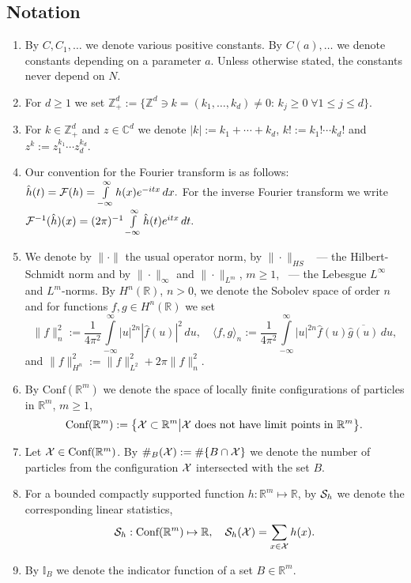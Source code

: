 \documentclass{article}
\numberwithin{equation}{section}
\newcommand{\mC}{\mathbb{C}}
\newcommand{\mR}{\mathbb{R}}
\newcommand{\mZ}{\mathbb{Z}}
\newcommand{\mI}{\mathbb{I}}
\newcommand{\FF}{{\cal F}}
\newcommand{\SSS}{{\cal S}}
\newcommand{\XX}{{\cal X}}
\newcommand{\ov}{\overline}
\newcommand{\ran}{\rangle}
\newcommand{\lan}{\langle}
\newcommand{\fr}{\frac}
\newcommand{\qu}{\quad}
\newcommand{\sli}{\sum\limits}
\newcommand{\ili}{\int\limits}
\newcommand{\lbl}{\label}
\newcommand{\bee}{\begin{equation}}
\newcommand{\eee}{\end{equation}}
\newcommand{\Zp}{\mathbb{Z}^d_+}
\newcommand{\Conf}{\mbox{Conf}}
\newcommand{\CoRr}{\Conf(\mR^m)}
\begin{document}
\subsection{Notation}
\lbl{sec:Notation}
\begin{enumerate}
\item By $C,C_1,\ldots$ we denote various positive constants. By $C(a), \ldots$ we denote constants depending on a parameter $a$.
Unless otherwise stated, the constants never depend on $N$.

\item For $d\geq 1$ we set $\Zp:=\{\mZ^d\ni k=(k_1,\ldots,k_d)\neq 0:\, k_j\geq 0\; \forall 1\leq j\leq d\}$.

\item\lbl{not:!} For $k\in\mZ^d_+$ and $z\in\mC^d$ we denote
$|k|:=k_1+\cdots+k_d$, $k!:=k_1!\cdots k_d!$ and $z^k:=z_1^{k_1}\cdots z_d^{k_d}$.

\item \lbl{not:F} Our convention for the Fourier transform is as follows:
$
\hat h(t)=\FF(h)=\ili_{-\infty}^\infty h(x)e^{-itx}\, dx.
$
For the inverse Fourier transform we write
$
\FF^{-1}(\hat h)(x)=(2\pi)^{-1}\ili_{-\infty}^\infty \hat h(t)e^{itx}\, dt.
$
\item We denote by $\|\cdot\|$ the usual operator norm, by $\|\cdot\|_{HS}$
~--- the Hilbert-Schmidt norm
and by $\|\cdot\|_\infty$ and $\|\cdot\|_{L^m}$, $m\geq 1$,
~--- the Lebesgue $L^\infty$ and  $L^m$-norms.
By $H^n(\mR)$, $n>0$, we denote the Sobolev space of order  $n$
and for functions $f,g\in H^n(\mR)$ we set
\bee\lbl{pairing}
\|f\|^2_{n} := \fr{1}{4\pi^2}\ili_{-\infty}^\infty |u|^{2n} |\hat f(u)|^2 \,du,
\qu
\lan f,g\ran_{n} := \fr{1}{4\pi^2} \ili_{-\infty}^\infty |u|^{2n}
\hat f(u) \ov{\hat g(u)}\,du,
\eee
and $\|f\|_{H^n}^2:=\|f\|^2_{L^2} + 2\pi\|f\|^2_n$.

\item By $\CoRr$ we denote the space of locally finite configurations of particles in
$\mR^m$, $m\geq 1$,
\bee\lbl{defConf}
\CoRr:=\big\{\XX\subset\mR^{m}\big| \XX\mbox{ does not have limit points in }\mR^m\big\}.
\eee

\item
Let $\XX\in\CoRr$.
By $\#_B(\XX):=\#\{B\cap\XX\}$ we denote the number of particles
from the configuration $\XX$
intersected with the set $B$.

\item For a bounded compactly supported function
$h:\mR^m\mapsto\mR$, by $\SSS_h$
we denote the corresponding linear statistics,
$$
\SSS_h:\CoRr\mapsto \mR,
\qu
\SSS_h(\XX)= \sli_{x\in\XX} h(x).
$$
\item By $\mI_B$ we denote the indicator function of a set $B\in\mR^m$.
\end{enumerate}
\end{document}
